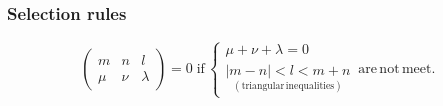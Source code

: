 \subsubsection*{Selection rules}

\begin{equation}
\left(\begin{array}{ccc}
m & n & l\\
\mu & \nu & \lambda
\end{array}\right)=0\;\mathrm{if}\,\left\{ \begin{array}{l}
\mu+\nu+\lambda=0\\
\underset{\mathrm{(triangular\,inequalities)}}{\left|m-n\right|<l<m+n}
\end{array}\right.\,\mathrm{are\,not\,meet.}\,
\end{equation}



